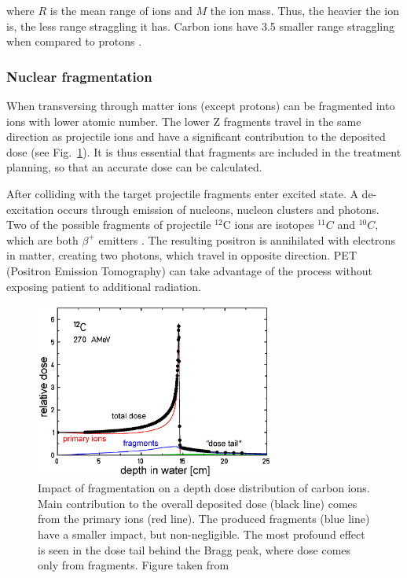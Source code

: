 where $R$ is the mean range of ions and $M$ the ion mass. Thus, the heavier the ion is, the less range straggling it has. Carbon ions have 3.5 smaller range straggling when compared to protons \cite{Schardt2010}.

\subsubsection{Nuclear fragmentation}
\label{nuclfrag}

When transversing through matter ions (except protons) can be fragmented into ions with lower atomic number. The lower Z fragments travel in the same direction as projectile ions and 
have a significant contribution to the deposited dose (see Fig.~\ref{iondd}). It is thus essential that fragments are included in the treatment planning, so that an accurate dose can be calculated.

After colliding with the target projectile fragments enter excited state. A de-excitation occurs through
emission of nucleons, nucleon clusters and photons. Two of the possible fragments of projectile $^{12}$C ions are isotopes $^{11}C$ and $^{10}C$, which are both $\beta^+$ emitters \cite{Kraft2000}.
The resulting positron is annihilated with electrons in matter, creating two photons, which travel in opposite direction. PET (Positron Emission Tomography) can take advantage of the process without exposing patient to additional radiation.

\begin{figure}[H]
\begin{center}
\includegraphics[width=0.7\textwidth]{./Fundamentals/Images/iondepthdosesum.png}
\caption{Impact of fragmentation on a depth dose distribution of carbon ions. Main contribution to the overall deposited dose (black line) comes from the primary ions (red line). The produced fragments 
(blue line) have a smaller impact, but non-negligible. The most profound effect is seen in the dose tail behind the Bragg peak, where dose comes only from fragments. Figure taken from \cite{Groezinger2004}}
\label{iondd}
\end{center}
\end{figure}

